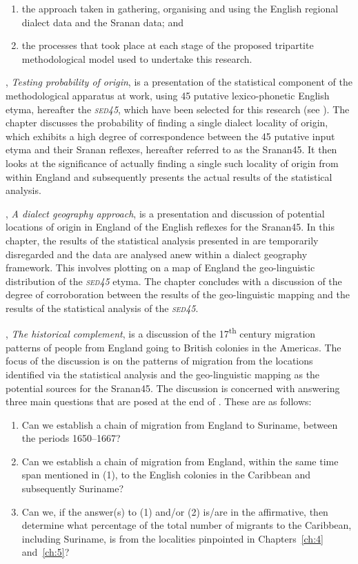 \begin{enumerate}
\renewcommand{\labelenumi}{\alph{enumi}.} 
\item the approach taken in gathering, organising and using the English regional dialect data and the Sranan data; and
\item the processes that took place at each stage of the proposed tripartite methodological model used to undertake this research.
\end{enumerate}

, \emph{Testing probability of origin}, is a presentation of the statistical component of the methodological apparatus at work, using 45 putative lexico-phonetic English etyma, hereafter the \textsc{\emph{sed45}}, which have been selected for this research (see ). The chapter discusses the probability of finding a single dialect locality of origin, which exhibits a high degree of correspondence between the 45 putative input etyma and their Sranan reflexes, hereafter referred to as the Sranan45. It then looks at the significance of actually finding a single such locality of origin from within England and subsequently presents the actual results of the statistical analysis.

, \emph{A dialect geography approach}, is a presentation and discussion of potential locations of origin in England of the English reflexes for the Sranan45. In this chapter, the results of the statistical analysis presented in  are temporarily disregarded and the data are analysed anew within a dialect geography framework. This involves plotting on a map of England the geo-linguistic distribution of the \textsc{\emph{sed45}} etyma. The chapter concludes with a discussion of the degree of corroboration between the results of the geo-linguistic mapping and the results of the statistical analysis of the  \textsc{\emph{sed45}}.

, \emph{The historical complement}, is a discussion of the 17\textsuperscript{th} century migration patterns of people from England going to British colonies in the Americas. The focus of the discussion is on the patterns of migration from the locations identified via the statistical analysis and the geo-linguistic mapping as the potential sources for the Sranan45. The discussion is concerned with answering three main questions that are posed at the end of . These are as follows:

\begin{enumerate}
\item Can we establish a chain of migration from England to Suriname, between the periods 1650--1667?
\item Can we establish a chain of migration from England, within the same time span mentioned in (1), to the English colonies in the Caribbean and subsequently Suriname?
\item Can we, if the answer(s) to (1) and/or (2) is/are in the affirmative, then determine what percentage of the total number of migrants to the Caribbean, including Suriname, is from the localities pinpointed in Chapters~\ref{ch:4} and~\ref{ch:5}?
\end{enumerate}

